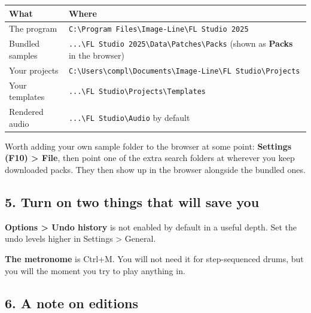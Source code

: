 {\def\LTcaptype{none} %
\begin{longtable}[]{@{}>{\raggedright\arraybackslash}p{}>{\raggedright\arraybackslash}p{}@{}}
\toprule\noalign{}
What & Where \\
\midrule\noalign{}
\endhead
\bottomrule\noalign{}
\endlastfoot
The program & \texttt{C:\textbackslash{}Program\ Files\textbackslash{}Image-Line\textbackslash{}FL\ Studio\ 2025} \\
Bundled samples & \texttt{...\textbackslash{}FL\ Studio\ 2025\textbackslash{}Data\textbackslash{}Patches\textbackslash{}Packs} (shown as \textbf{Packs} in the browser) \\
Your projects & \texttt{C:\textbackslash{}Users\textbackslash{}compl\textbackslash{}Documents\textbackslash{}Image-Line\textbackslash{}FL\ Studio\textbackslash{}Projects} \\
Your templates & \texttt{...\textbackslash{}FL\ Studio\textbackslash{}Projects\textbackslash{}Templates} \\
Rendered audio & \texttt{...\textbackslash{}FL\ Studio\textbackslash{}Audio} by default \\
\end{longtable}
}

Worth adding your own sample folder to the browser at some point: \textbf{Settings (F10) \textgreater{} File},
then point one of the extra search folders at wherever you keep downloaded packs. They then
show up in the browser alongside the bundled ones.

\subsection{5. Turn on two things that will save you}\label{fl00_setup-5-turn-on-two-things-that-will-save-you}

\textbf{Options \textgreater{} Undo history} is not enabled by default in a useful depth. Set the undo levels
higher in Settings \textgreater{} General.

\textbf{The metronome} is Ctrl+M. You will not need it for step-sequenced drums, but you will the
moment you try to play anything in.

\subsection{6. A note on editions}\label{fl00_setup-6-a-note-on-editions}

